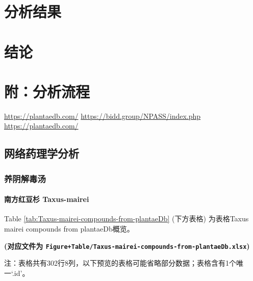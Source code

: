 \documentclass[
]{article}
\begin{document}
\hypertarget{results}{%
\section{分析结果}\label{results}}

\hypertarget{dis}{%
\section{结论}\label{dis}}

\hypertarget{workflow}{%
\section{附：分析流程}\label{workflow}}

\url{https://plantaedb.com/}
\url{https://bidd.group/NPASS/index.php}
\url{https://plantaedb.com/}

\hypertarget{ux7f51ux7edcux836fux7406ux5b66ux5206ux6790}{%
\subsection{网络药理学分析}\label{ux7f51ux7edcux836fux7406ux5b66ux5206ux6790}}

\hypertarget{ux517bux9634ux89e3ux6bd2ux6c64}{%
\subsubsection{养阴解毒汤}\label{ux517bux9634ux89e3ux6bd2ux6c64}}

\hypertarget{ux5357ux65b9ux7ea2ux8c46ux6749-taxus-mairei}{%
\paragraph{南方红豆杉 Taxus-mairei}\label{ux5357ux65b9ux7ea2ux8c46ux6749-taxus-mairei}}

Table \ref{tab:Taxus-mairei-compounds-from-plantaeDb} (下方表格) 为表格Taxus mairei compounds from plantaeDb概览。

\textbf{(对应文件为 \texttt{Figure+Table/Taxus-mairei-compounds-from-plantaeDb.xlsx})}

\begin{center}\begin{tcolorbox}[colback=gray!10, colframe=gray!50, width=0.9\linewidth, arc=1mm, boxrule=0.5pt]注：表格共有302行8列，以下预览的表格可能省略部分数据；表格含有1个唯一`.id'。
\end{tcolorbox}
\end{center}
\end{document}
